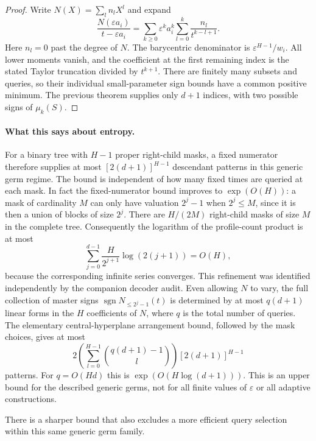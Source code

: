 \documentclass[11pt]{article}
\begin{document}
\begin{proof}
Write $N(X)=\sum_l n_lX^l$ and expand
\[
 \frac{N(\varepsilon a_i)}{t-\varepsilon a_i}
 =\sum_{k\geq0}\varepsilon^k a_i^k
    \sum_{l=0}^{k}\frac{n_l}{t^{k-l+1}}.
\]
Here $n_l=0$ past the degree of $N$. The barycentric denominator is
$\varepsilon^{H-1}/w_i$. All lower moments vanish, and the coefficient
at the first remaining index is the stated Taylor truncation divided
by $t^{k+1}$. There are finitely many subsets and queries, so their
individual small-parameter sign bounds have a common positive minimum.
The previous theorem supplies only $d+1$ indices, with two possible
signs of $\mu_k(S)$.
\end{proof}

\paragraph{What this says about entropy.}
For a binary tree with $H-1$ proper right-child masks, a fixed numerator
therefore supplies at most $[2(d+1)]^{H-1}$ descendant patterns in this
generic germ regime. The bound is independent of how many fixed times
are queried at each mask. In fact the fixed-numerator bound improves to
$\exp(O(H))$: a mask of cardinality $M$ can only have valuation
$2^j-1$ when $2^j\leq M$, since it is then a union of blocks of size
$2^j$. There are $H/(2M)$ right-child masks of size $M$ in the complete
tree. Consequently the logarithm of the profile-count product is at most
\[
 \sum_{j=0}^{d-1}\frac{H}{2^{j+1}}\log(2(j+1))=O(H),
\]
because the corresponding infinite series converges. This refinement
was identified independently by the companion decoder audit.
Even allowing $N$ to vary, the full collection
of master signs $\operatorname{sgn}N_{\leq 2^j-1}(t)$ is determined by
at most $q(d+1)$ linear forms in the $H$ coefficients of $N$, where $q$
is the total number of queries. The elementary central-hyperplane
arrangement bound, followed by the mask choices, gives at most
\[
 2\left(\sum_{l=0}^{H-1}\binom{q(d+1)-1}{l}\right)
 [2(d+1)]^{H-1}
\]
patterns. For $q=O(Hd)$ this is $\exp(O(H\log(d+1)))$.
This is an upper bound for the described generic germs, not for all
finite values of $\varepsilon$ or all adaptive constructions.

There is a sharper bound that also excludes a more efficient query
selection within this same generic germ family.
\end{document}
